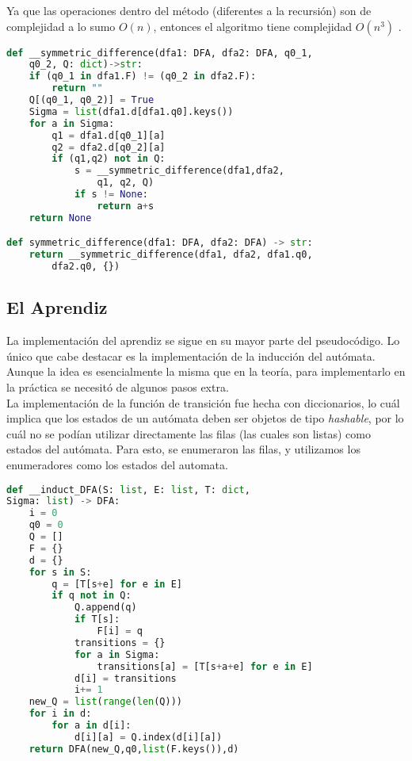 \documentclass[12pt]{amsart}
\begin{document}
Ya que las operaciones dentro del método (diferentes a la recursión) son de complejidad a lo sumo $O(n)$, entonces el algoritmo tiene complejidad $O(n^{3})$ .

\begin{lstlisting}[language = Python]
def __symmetric_difference(dfa1: DFA, dfa2: DFA, q0_1,
    q0_2, Q: dict)->str:
    if (q0_1 in dfa1.F) != (q0_2 in dfa2.F):
        return ""
    Q[(q0_1, q0_2)] = True
    Sigma = list(dfa1.d[dfa1.q0].keys())
    for a in Sigma:
        q1 = dfa1.d[q0_1][a]
        q2 = dfa2.d[q0_2][a]
        if (q1,q2) not in Q:
            s = __symmetric_difference(dfa1,dfa2,
                q1, q2, Q)
            if s != None:
                return a+s
    return None

def symmetric_difference(dfa1: DFA, dfa2: DFA) -> str:
    return __symmetric_difference(dfa1, dfa2, dfa1.q0,
        dfa2.q0, {})
\end{lstlisting}

\subsection{El Aprendiz}

La implementación del aprendiz se sigue en su mayor parte del pseudocódigo. Lo único que cabe destacar es la implementación de la inducción del autómata. Aunque la idea es esencialmente la misma que en la teoría, para implementarlo en la práctica se necesitó de algunos pasos extra. \\

La implementación de la función de transición fue hecha con diccionarios, lo cuál implica que los estados de un autómata deben ser objetos de tipo \textit{hashable}, por lo cuál no se podían utilizar directamente las filas (las cuales son listas) como estados del autómata. Para esto, se enumeraron las filas, y utilizamos los enumeradores como los estados del automata.

\begin{lstlisting}[language= Python]
def __induct_DFA(S: list, E: list, T: dict,
Sigma: list) -> DFA:
    i = 0
    q0 = 0
    Q = []
    F = {}
    d = {}
    for s in S:
        q = [T[s+e] for e in E]
        if q not in Q:
            Q.append(q)
            if T[s]:
                F[i] = q
            transitions = {}
            for a in Sigma:
                transitions[a] = [T[s+a+e] for e in E]
            d[i] = transitions
            i+= 1
    new_Q = list(range(len(Q)))
    for i in d:
        for a in d[i]:
            d[i][a] = Q.index(d[i][a])
    return DFA(new_Q,q0,list(F.keys()),d)
\end{lstlisting}
\end{document}
